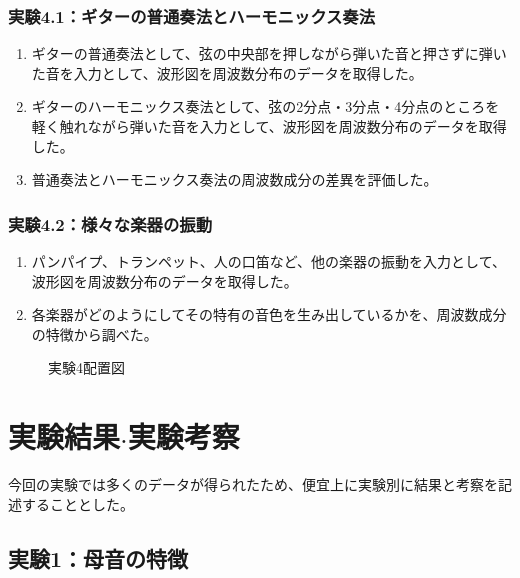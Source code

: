 \documentclass{article}
\begin{document}
\subsubsection{実験4.1：ギターの普通奏法とハーモニックス奏法}
\begin{enumerate}[label=\arabic*)]
    \item ギターの普通奏法として、弦の中央部を押しながら弾いた音と押さずに弾いた音を入力として、波形図を周波数分布のデータを取得した。
    \item ギターのハーモニックス奏法として、弦の2分点・3分点・4分点のところを軽く触れながら弾いた音を入力として、波形図を周波数分布のデータを取得した。
    \item 普通奏法とハーモニックス奏法の周波数成分の差異を評価した。
\end{enumerate}

\subsubsection{実験4.2：様々な楽器の振動}
\begin{enumerate}[label=\arabic*)]
    \item パンパイプ、トランペット、人の口笛など、他の楽器の振動を入力として、波形図を周波数分布のデータを取得した。
    \item 各楽器がどのようにしてその特有の音色を生み出しているかを、周波数成分の特徴から調べた。
\end{enumerate}
\begin{figure}[ht] %
    \centering
    \caption{実験4配置図}
\end{figure}
\FloatBarrier


\section{実験結果$\cdot$実験考察}
今回の実験では多くのデータが得られたため、便宜上に実験別に結果と考察を記述することとした。

\subsection{実験1：母音の特徴}
\end{document}
